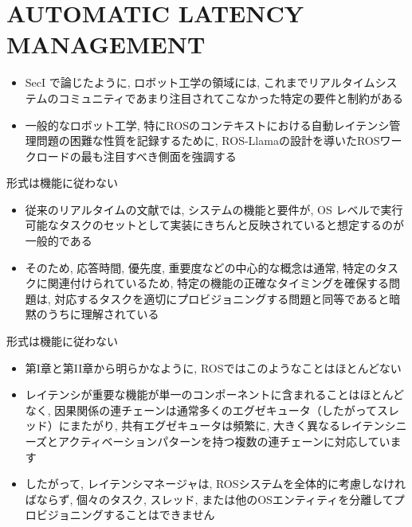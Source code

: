 
\section{AUTOMATIC LATENCY MANAGEMENT}
\label{sec: automatic latency management}

\begin{frame}{}
    \begin{itemize}
        \item SecI で論じたように, ロボット工学の領域には, これまでリアルタイムシステムのコミュニティであまり注目されてこなかった特定の要件と制約がある
        \item 一般的なロボット工学, 特にROSのコンテキストにおける自動レイテンシ管理問題の困難な性質を記録するために, ROS-Llamaの設計を導いたROSワークロードの最も注目すべき側面を強調する
    \end{itemize}
\end{frame}

\begin{frame}{形式は機能に従わない}
    \begin{itemize}
        \item 従来のリアルタイムの文献では, システムの機能と要件が, OS レベルで実行可能なタスクのセットとして実装にきちんと反映されていると想定するのが一般的である
        \item そのため, 応答時間, 優先度, 重要度などの中心的な概念は通常, 特定のタスクに関連付けられているため, 特定の機能の正確なタイミングを確保する問題は, 対応するタスクを適切にプロビジョニングする問題と同等であると暗黙のうちに理解されている
    \end{itemize}
\end{frame}

\begin{frame}{形式は機能に従わない}
    \begin{itemize}
        \item 第I章と第II章から明らかなように, ROSではこのようなことはほとんどない
        \item レイテンシが重要な機能が単一のコンポーネントに含まれることはほとんどなく, 因果関係の連チェーンは通常多くのエグゼキュータ（したがってスレッド）にまたがり, 共有エグゼキュータは頻繁に, 大きく異なるレイテンシニーズとアクティベーションパターンを持つ複数の連チェーンに対応しています
        \item したがって, レイテンシマネージャは, ROSシステムを全体的に考慮しなければならず, 個々のタスク, スレッド, または他のOSエンティティを分離してプロビジョニングすることはできません
    \end{itemize}
\end{frame}

